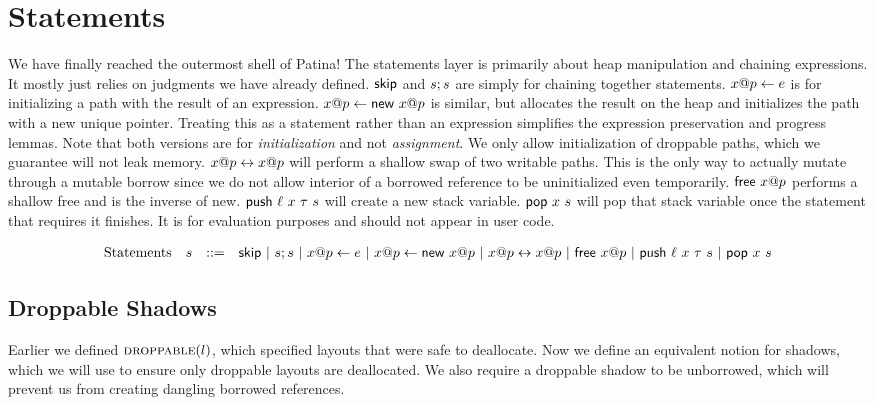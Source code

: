 \section*{Statements}
We have finally reached the outermost shell of Patina!
The statements layer is primarily about heap manipulation and chaining expressions.
It mostly just relies on judgments we have already defined.
$\mathsf{skip}$ and ${s};{s}$ are simply for chaining together statements.
${{x}@{p}} \leftarrow {e}$ is for initializing a path with the result of an expression.
${{x}@{p}} \leftarrow \textsf{new}\ {{x}@{p}}$ is similar, but allocates the result on the heap 
and initializes the path with a new unique pointer. 
Treating this as a statement rather than an expression
simplifies the expression preservation and progress lemmas.
Note that both versions are for \emph{initialization} and not \emph{assignment}.
We only allow initialization of droppable paths, which we guarantee will not leak memory.
${{x}@{p}} \leftrightarrow {{x}@{p}}$ will perform a shallow swap of two writable paths.
This is the only way to actually mutate through a mutable borrow since we do not allow
interior of a borrowed reference to be uninitialized even temporarily.
$\textsf{free}\ {{x}@{p}}$ performs a shallow free and is the inverse of \textsf{new}.
$\textsf{push}\ {\ell}\ {x}\ {\tau}\ {s}$ will create a new stack variable.
$\textsf{pop}\ {x}\ {s}$ will pop that stack variable once the statement that requires it finishes.
It is for evaluation purposes and should not appear in user code.

\[
\begin{array}{lccl}
\textrm{Statements} & s & ::= & \mathsf{skip} ~|~ {s};{s} ~|~ {{x}@{p}} \leftarrow {e}
			  ~|~ {{x}@{p}} \leftarrow \textsf{new}\ {{x}@{p}} ~|~ {{x}@{p}} \leftrightarrow {{x}@{p}}
			  ~|~ \textsf{free}\ {{x}@{p}} ~|~ \textsf{push}\ {\ell}\ {x}\ {\tau}\ {s}
			  ~|~ \textsf{pop}\ {x}\ {s}
\end{array}
\]

\subsection*{Droppable Shadows}
Earlier we defined $\textsc{droppable}(l)$, which specified layouts that were safe to deallocate.
Now we define an equivalent notion for shadows, which we will use to ensure only droppable
layouts are deallocated. We also require a droppable shadow to be unborrowed, which will
prevent us from creating dangling borrowed references.
\newline


